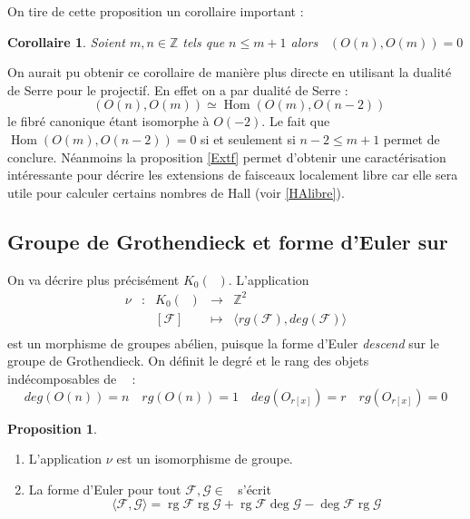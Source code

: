 \documentclass[12pt]{article}
\DeclareMathOperator{\Hom}{Hom}
\DeclareMathOperator{\ext}{Ext^{1}}
\DeclareMathOperator{\rg}{rg}
\DeclareMathOperator{\coh}{Coh(\mathbb{P}_{k}^{1})}
\theoremstyle{definition}
\newtheorem{Prop}{Proposition}[section]
\newtheorem{cor}{Corollaire}[section]
\begin{document}
On tire de cette proposition un corollaire important :
\begin{cor}\label{freesplit}\textit{Soient $m,n\in\mathbb{Z}$ tels que $n\leqslant m+1$ alors $\ext(O(n),O(m))=0$}
\end{cor} 
On aurait pu obtenir ce corollaire de manière plus directe en utilisant la dualité de Serre pour le projectif. En effet on a par dualité de Serre : $$\ext(O(n),O(m))\simeq\Hom(O(m),O(n-2))$$ le fibré canonique étant isomorphe à $O(-2)$. Le fait que $\Hom(O(m),O(n-2))=0$ si et seulement si $n-2\leqslant m+1$ permet de conclure. Néanmoins la proposition \ref{Extf} permet d'obtenir une caractérisation intéressante pour décrire les extensions de faisceaux localement libre car elle sera utile pour calculer certains nombres de Hall (voir \ref{HAlibre}).
\subsection{Groupe de Grothendieck et forme d'Euler sur $\coh$}\label{form}
On va décrire plus précisément $K_0(\coh)$. L'application $$\begin{array}{ccccc}
\nu  & : &  K_0(\coh) & \to &\mathbb{Z}^2  \\
 & & [\mathcal{F}] & \mapsto & \langle rg(\mathcal{F}),deg(\mathcal{F})\rangle \\
\end{array}$$ est un morphisme de groupes abélien, puisque la forme d'Euler \textit{descend} sur le groupe de Grothendieck. On définit le degré et le rang des objets indécomposables de $\coh$ : $$deg(O(n))=n\quad rg(O(n))=1\quad deg(O_{r[x]})=r\quad rg(O_{r[x]})=0$$ \begin{Prop}\label{EUL}\begin{enumerate}
\item L'application $\nu$ est un isomorphisme de groupe.
\item La forme d'Euler pour tout $\mathcal{F},\mathcal{G}\in\coh$ s'écrit $$\langle \mathcal{F},\mathcal{G}\rangle = \rg\mathcal{F}\rg\mathcal{G}+\rg\mathcal{F}\deg\mathcal{G}-\deg\mathcal{F}\rg\mathcal{G}$$
\end{enumerate}
\end{Prop}
\end{document}

